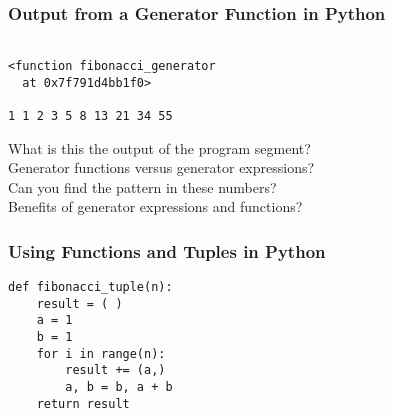 \documentclass[14pt,aspectratio=169]{beamer}
\begin{document}
%
\begin{frame}[fragile]
  \frametitle{Output from a Generator Function in Python}
  \normalsize
  \begin{minipage}{6in}
    \vspace*{.1in}
    \begin{verbatim}

<function fibonacci_generator
  at 0x7f791d4bb1f0>

1 1 2 3 5 8 13 21 34 55
    \end{verbatim}
  \vspace*{.05in}
  \begin{center}
    \normalsize \noindent What is this the output of the program segment? \\
    \normalsize \noindent Generator functions versus generator expressions? \\
    \normalsize \noindent Can you find the pattern in these numbers? \\
    \normalsize \noindent Benefits of generator expressions and functions? \\
  \end{center}
  \end{minipage}
\end{frame}

%
\begin{frame}[fragile]
  \frametitle{Using Functions and Tuples in Python}
  \normalsize
  \begin{minipage}{6in}
    \vspace*{.1in}
    \begin{verbatim}
def fibonacci_tuple(n):
    result = ( )
    a = 1
    b = 1
    for i in range(n):
        result += (a,)
        a, b = b, a + b
    return result
    \end{verbatim}
  \end{minipage}
\end{frame}
\end{document}
